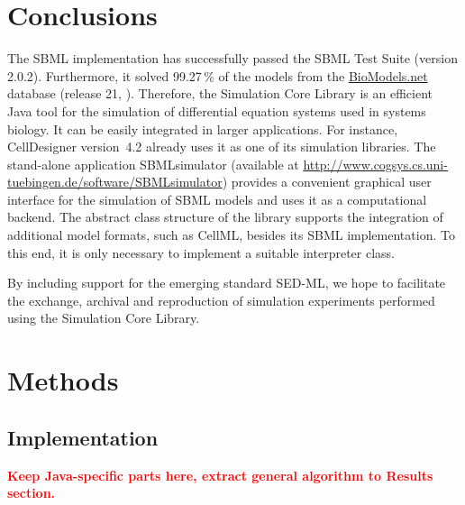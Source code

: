 \documentclass[10pt]{bmc_article}
\newenvironment{bmcformat}{\baselineskip20pt\sloppy\setboolean{publ}{false}}{\baselineskip20pt\sloppy}
\newcommand{\TODO}[1]{\textcolor{red}{\textbf{#1}}}
\begin{document}
\begin{bmcformat}
\section{Conclusions}
The SBML implementation has successfully passed the
SBML Test Suite (version 2.0.2).
Furthermore, it solved 99.27\,\% of the models from the
\href{http://biomodels.net}{BioModels.net} database (release 21,
\cite{Novere2006a}).
Therefore, the Simulation Core Library is an efficient Java tool for the
simulation of differential equation systems used in systems biology. It can be
easily integrated in larger applications. For instance,
CellDesigner version~4.2 \cite{Funahashi2003} already uses it as one of its simulation libraries.
The stand-alone application SBMLsimulator (available at
\href{http://www.cogsys.cs.uni-tuebingen.de/software/SBMLsimulator}{http://www.cogsys.cs.uni-tuebingen.de/software/SBMLsimulator})
provides a convenient graphical user interface for the simulation of SBML
models and uses it as a computational backend.
The abstract class structure of the library supports the integration of
additional model formats, such as CellML, besides its SBML implementation. To
this end, it is only necessary to implement a suitable interpreter class.


By including support for the emerging standard SED-ML, we hope to facilitate the
exchange, archival and reproduction of simulation experiments performed using
the Simulation Core Library.

\section{Methods}

\subsection{Implementation}

\TODO{Keep Java-specific parts here, extract general algorithm to Results
section.}


\end{bmcformat}
\end{document}
